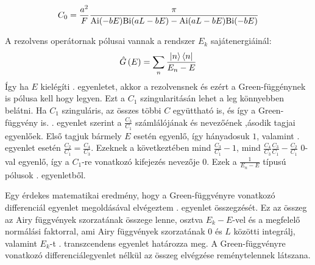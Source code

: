 \begin{equation}
	C_0 = \frac{a^2}{F}\frac{\pi}{\mathrm{Ai}(-bE)\mathrm{Bi}(aL-bE)-\mathrm{Ai}(aL-bE)\mathrm{Bi}(-bE)}
\end{equation}

A rezolvens operátornak pólusai vannak a rendszer $E_k$ sajátenergiáinál:
\begin{equation}
	\hat{G}\left(E\right) = \sum_n \frac{\Ket{n}\Bra{n}}{E_n - E}
	\label{green:greensum}
\end{equation}
Így ha $E$ kielégíti . egyenletet, akkor a rezolvensnek és ezért a Green-függénynek is pólusa kell hogy legyen. Ezt a $C_1$ szingularitásán lehet a leg könnyebben belátni. Ha $C_1$ szinguláris, az összes többi $C$ együttható is, és így a Green-függvény is. . egyenlet szerint a $\frac{C_3}{C_1}$ számlálójának és nevezőének ,ásodik tagjai egyenlőek. Első tagjuk bármely $E$ esetén egyenlő, így  hányadosuk $1$, valamint . egyenlet esetén $\frac{C_2}{C_1} = \frac{C_4}{C_3}$. Ezeknek a következtében mind $\frac{C_3}{C_1} - 1$, mind $\frac{C_4}{C_3}\frac{C_3}{C_1} - \frac{C_2}{C_1}$ $0$-val egyenlő, így a $C_1$-re vonatkozó kifejezés nevezője $0$. Ezek a $\frac{1}{E_n - E}$ típusú pólusok . egyenletből.

Egy érdekes matematikai eredmény, hogy a Green-függvényre vonatkozó differenciál egyenlet megoldásával elvégeztem . egyenlet összegzését. Ez az összeg az Airy függvények szorzatának összege lenne, osztva $E_k-E$-vel és a megfelelő normálási faktorral, ami Airy függvények szorzatának $0$ és $L$ közötti integrálj, valamint $E_k$-t . transzcendens egyenlet határozza meg. A Green-függvényre vonatkozó differenciálegyenlet nélkül az összeg elvégzése reménytelennek látszana.
